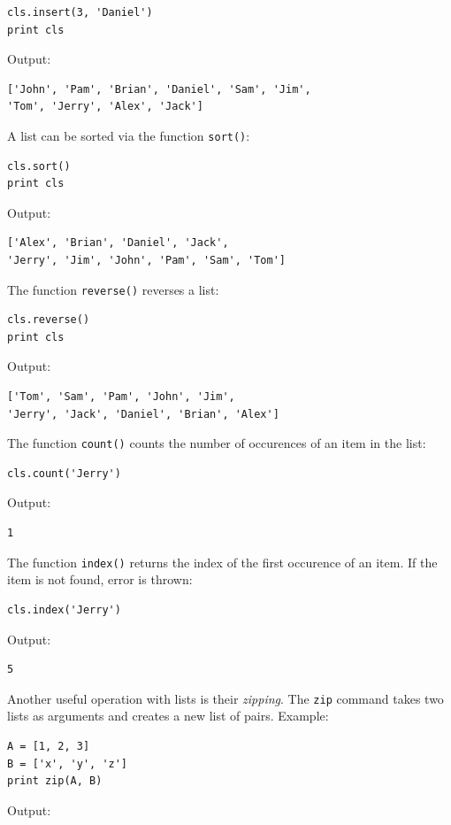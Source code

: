 \begin{verbatim}
cls.insert(3, 'Daniel')
print cls
\end{verbatim}
Output:

\begin{verbatim}
['John', 'Pam', 'Brian', 'Daniel', 'Sam', 'Jim', 
'Tom', 'Jerry', 'Alex', 'Jack']
\end{verbatim}
A list can be sorted via the function {\tt sort()}:

\begin{verbatim}
cls.sort()
print cls
\end{verbatim}
Output:

\begin{verbatim}
['Alex', 'Brian', 'Daniel', 'Jack', 
'Jerry', 'Jim', 'John', 'Pam', 'Sam', 'Tom']
\end{verbatim}
The function {\tt reverse()} reverses a list:

\begin{verbatim}
cls.reverse()
print cls
\end{verbatim}
Output:

\begin{verbatim}
['Tom', 'Sam', 'Pam', 'John', 'Jim', 
'Jerry', 'Jack', 'Daniel', 'Brian', 'Alex']
\end{verbatim}
The function {\tt count()} counts the number of occurences of an item
in the list:

\begin{verbatim}
cls.count('Jerry')
\end{verbatim}
Output:

\begin{verbatim}
1
\end{verbatim}
The function {\tt index()} returns the index of the first occurence 
of an item. If the item is not found, error is thrown:

\begin{verbatim}
cls.index('Jerry')
\end{verbatim}
Output:

\begin{verbatim}
5
\end{verbatim}
Another useful operation with lists is their {\em zipping}. The {\tt zip} command takes two lists as arguments 
and creates a new list of pairs. Example:

\begin{verbatim}
A = [1, 2, 3]
B = ['x', 'y', 'z']
print zip(A, B)
\end{verbatim}
Output:

